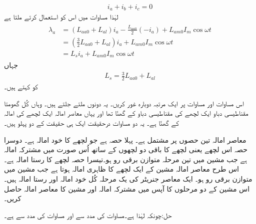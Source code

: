 \begin{align}
i_a+i_b+i_c=0
\end{align}
لہٰذا مساوات   میں اس کو استعمال کرتے ملتا ہے
\begin{gather}
\begin{aligned}
\lambda_a&=\left(L_{aa0}+L_{al} \right)i_a-\frac{L_{aa0}}{2} \left( -i_a \right)+L_{am0} I_m \cos \omega t\\
&=\left(\frac{3}{2} L_{aa0}+L_{al} \right)i_a+L_{am0} I_m \cos \omega t\\
&=L_s i_a+L_{am0} I_m \cos \omega t
\end{aligned}
\end{gather}
جہاں
\begin{align}\label{مساوات_معاصر_معاصر_امالہ}
L_s=\frac{3}{2} L_{aa0}+L_{al}
\end{align}
کو  کہتے ہیں۔

اس مساوات اور مساوات   پر ایک مرتبہ دوبارہ غور کریں۔ یہ دونوں ملتے جلتے ہیں۔ وہاں کُل گھومتا مقناطیسی دباو ایک لچھے کی مقناطیسی دباو کے   گھنّا تھا اور یہاں معاصر امالہ ایک لچھے کی امالہ کے  گھنّا ہے۔ یہ دو مساوات درحقیقت ایک ہی حقیقت کے دو پہلو ہیں۔

معاصر امالہ تین حصوں پر مشتمل ہے۔ پہلا حصہ  ہے جو  لچھے کا خود امالہ ہے۔ دوسرا حصہ   اس لچھے یعنی  لچھے کا باقی دو لچھوں کے ساتھ اُس صورت میں مشترکہ امالہ ہے جب مشین میں تین مرحلہ متوازن برقی رو ہو۔تیسرا حصہ  لچھے   کا رستا امالہ ہے۔ اس طرح معاصر امالہ مشین کے ایک لچھے کا ظاہری امالہ ہوتا ہے جب مشین میں متوازن برقی رو ہو۔
%
ایک معاصر جنریٹر کی یک مرحلہ  کُل خود امالہ  اور رستا امالہ  ہیں۔اس مشین کے دو مرحلوں  کا آپس میں مشترکہ امالہ اور مشین کا معاصر امالہ حاصل کریں۔

حل:چونکہ   لہٰذا  ہے۔مساوات   کی مدد سے   اور مساوات   کی مدد سے   ہے۔
%

